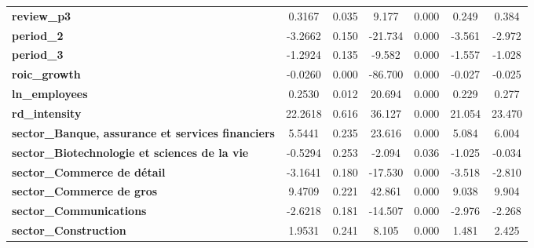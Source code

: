 \begin{center}
\begin{tabular}{lcccccc}
\textbf{review\_p3}                                                   &       0.3167  &        0.035     &     9.177  &         0.000        &        0.249    &        0.384     \\
\textbf{period\_2}                                                    &      -3.2662  &        0.150     &   -21.734  &         0.000        &       -3.561    &       -2.972     \\
\textbf{period\_3}                                                    &      -1.2924  &        0.135     &    -9.582  &         0.000        &       -1.557    &       -1.028     \\
\textbf{roic\_growth}                                                 &      -0.0260  &        0.000     &   -86.700  &         0.000        &       -0.027    &       -0.025     \\
\textbf{ln\_employees}                                                &       0.2530  &        0.012     &    20.694  &         0.000        &        0.229    &        0.277     \\
\textbf{rd\_intensity}                                                &      22.2618  &        0.616     &    36.127  &         0.000        &       21.054    &       23.470     \\
\textbf{sector\_Banque, assurance et services financiers}             &       5.5441  &        0.235     &    23.616  &         0.000        &        5.084    &        6.004     \\
\textbf{sector\_Biotechnologie et sciences de la vie}                 &      -0.5294  &        0.253     &    -2.094  &         0.036        &       -1.025    &       -0.034     \\
\textbf{sector\_Commerce de détail}                                   &      -3.1641  &        0.180     &   -17.530  &         0.000        &       -3.518    &       -2.810     \\
\textbf{sector\_Commerce de gros}                                     &       9.4709  &        0.221     &    42.861  &         0.000        &        9.038    &        9.904     \\
\textbf{sector\_Communications}                                       &      -2.6218  &        0.181     &   -14.507  &         0.000        &       -2.976    &       -2.268     \\
\textbf{sector\_Construction}                                         &       1.9531  &        0.241     &     8.105  &         0.000        &        1.481    &        2.425     \\

\end{tabular}
\end{center}
